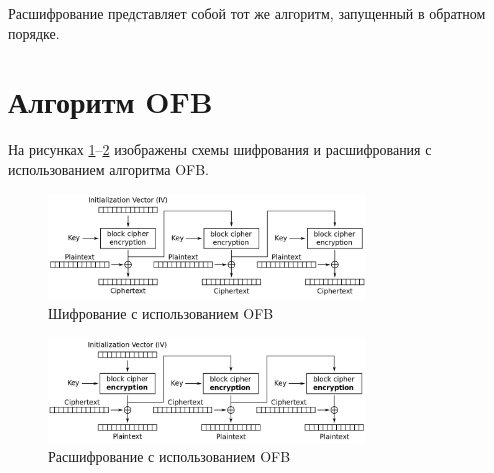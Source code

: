 Расшифрование представляет собой тот же алгоритм, запущенный в обратном порядке.

\newpage

\section{Алгоритм OFB}

На рисунках \ref{fig:ofb_enc.jpeg}--\ref{fig:ofb_dec.jpeg} изображены схемы шифрования и расшифрования с использованием алгоритма OFB.

\begin{figure}[h!]
\centering
\includegraphics[width=0.75\textwidth]{assets/ofb_enc.jpeg}
\caption{Шифрование с использованием OFB}
\label{fig:ofb_enc.jpeg}
\end{figure}

\begin{figure}[h!]
\centering
\includegraphics[width=0.75\textwidth]{assets/ofb_dec.jpeg}
\caption{Расшифрование с использованием OFB}
\label{fig:ofb_dec.jpeg}
\end{figure}


